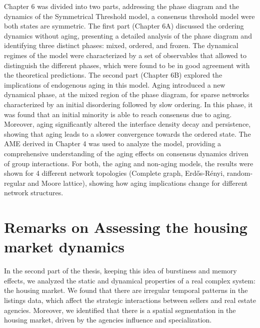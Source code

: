 Chapter 6 was divided into two parts, addressing the phase diagram and the dynamics of the Symmetrical Threshold model, a consensus threshold model were both states are symmetric. The first part (Chapter 6A) discussed the ordering dynamics without aging, presenting a detailed analysis of the phase diagram and identifying three distinct phases: mixed, ordered, and frozen. The dynamical regimes of the model were characterized by a set of observables that allowed to distinguish the different phases, which were found to be in good agreement with the theoretical predictions. The second part (Chapter 6B) explored the implications of endogenous aging in this model. Aging introduced a new dynamical phase, at the mixed region of the phase diagram, for sparse networks characterized by an initial disordering followed by slow ordering. In this phase, it was found that an initial minority is able to reach consensus due to aging. Moreover, aging significantly altered the interface density decay and persistence, showing that aging leads to a slower convergence towards the ordered state. The AME derived in Chapter 4 was used to analyze the model, providing a comprehensive understanding of the aging effects on consensus dynamics driven of group interactions. For both, the aging and non-aging models, the results were shown for 4 different network topologies (Complete graph, Erd\H{o}s-Rényi, random-regular and Moore lattice), showing how aging implications change for different network structures.

\section{Remarks on Assessing the housing market dynamics \label{sec:housing_market_dynamics}}

In the second part of the thesis, keeping this idea of burstiness and memory effects, we analyzed the static and dynamical properties of a real complex system: the housing market. We found that there are irregular temporal patterns in the listings data, which affect the strategic interactions between sellers and real estate agencies. Moreover, we identified that there is a spatial segmentation in the housing market, driven by the agencies influence and specialization.

